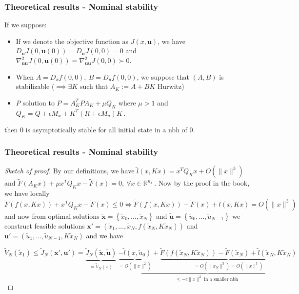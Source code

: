 \documentclass[10pt]{beamer}
\def\bb#1{\mathbb{#1}}
\def\bf#1{\mathbf{#1}}
\begin{document}
\begin{frame}
    \frametitle{Theoretical results - Nominal stability}
    \begin{theorem}
        If we suppose:
        \begin{itemize}[label=\textbullet]
            \item If we denote the objective function as $J(x,\bf{u})$, we have $D_\bf{u}J(0,\bf{u}(0))=D_\bf{u}J(0,0)=0$ and $\nabla^2_{\bf{u}\bf{u}}J(0,\bf{u}(0))=\nabla^2_{\bf{u}\bf{u}}J(0,0)\succ 0$.

            \item When $A=D_xf(0,0),~B=D_uf(0,0)$, we suppose that $(A,B)$ is stabilizable ($\implies \exists K$ such that $A_K:=A+BK$ Hurwitz)

            \item $P$ solution to $P=A_K^TPA_K+\mu Q_K$ where $\mu>1$ and $Q_K=Q+\epsilon M_x+K^T(R+\epsilon M_u)K$\,.
        \end{itemize}
        then 0 is asymptotically stable for all initial state in a nbh of 0.
    \end{theorem}
\end{frame}

\begin{frame}
    \frametitle{Theoretical results - Nominal stability}
    \begin{proof}[Sketch of proof]

        By our definitions, we have $\tilde{l}(x,Kx)=x^TQ_Kx+O(\|x\|^3)$ and $\tilde{F}(A_Kx)+\mu x^T Q_K x-\tilde{F}(x)=0,~\forall x\in\bb{R}^{n_x}$\,.
        Now by the proof in the book, we have locally
        $$\tilde{F}(f(x,Kx))+x^T Q_K x-\tilde{F}(x)\leq 0
		\Longleftrightarrow\tilde{F}(f(x,Kx))-\tilde{F}(x)+\tilde{l}(x,Kx) = O(\|x\|^3)$$
        and now from optimal solutions $\tilde{\bf{x}}=\left\{ \tilde{x}_0,\dots,\tilde{x}_N \right\}$ and $\tilde{\bf{u}}=\left\{ \tilde{u}_0,\dots,\tilde{u}_{N-1} \right\}$ we construct feasible solutions $\bf{x}'=(\tilde{x}_1,\dots,\tilde{x}_N,f(\tilde{x}_N,K\tilde{x}_N))$ and $\bf{u}'=(\tilde{u}_1,\dots,\tilde{u}_{N-1},K\tilde{x}_N)$ and we have

        $$\tilde{V}_N(\tilde{x}_1)\leq\tilde{J}_N(\bf{x}',\bf{u}')=\underbrace{\tilde{J}_N(\tilde{\bf{x}},\tilde{\bf{u}})}_{=\tilde{V}_N(x)}~\underbrace{\underbrace{-\tilde{l}(x,\tilde{u}_0)}_{=O(\|x\|^2)}+\underbrace{\tilde{F}(f(\tilde{x}_N,K\tilde{x}_N))-\tilde{F}(\tilde{x}_N)+\tilde{l}(\tilde{x}_N,K\tilde{x}_N) }_{=O(\|\tilde{x}_N\|^3)=O(\|x\|^3)} }_{\leq-c\|x\|^2\text{ in a smaller nbh }}$$
    \end{proof}
\end{frame}
\end{document}
